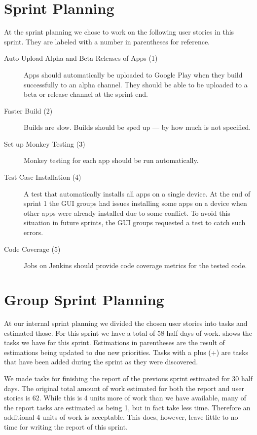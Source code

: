 \section{\bdtitle Sprint Planning}\label{sec:S2_bd}
At the \bd sprint planning we chose to work on the following user stories in this sprint. They are labeled with a number in parentheses for reference.

\begin{description}
  \item[Auto Upload Alpha and Beta Releases of Apps (1)] Apps should automatically be uploaded to Google Play when they build successfully to an alpha channel. They should be able to be uploaded to a beta or release channel at the sprint end.
  \item[Faster Build (2)] Builds are slow. Builds should be sped up --- by how much is not specified.
  \item[Set up Monkey Testing (3)] Monkey testing for each app should be run automatically.
  \item[Test Case Installation (4)] A test that automatically installs all apps on a single device. At the end of sprint 1 the GUI groups had issues installing some apps on a device when other apps were already installed due to some conflict. To avoid this situation in future sprints, the GUI groups requested a test to catch such errors.
  \item[Code Coverage (5)] Jobs on Jenkins should provide code coverage metrics for the tested code.
\end{description}

\section{Group Sprint Planning}\label{sec:S2_group}
At our internal sprint planning we divided the chosen user stories into tasks and estimated those. For this sprint we have a total of 58 half days of work.  shows the tasks we have for this sprint. Estimations in parentheses are the result of estimations being updated to due new priorities. Tasks with a plus (+) are tasks that have been added during the sprint as they were discovered.

We made tasks for finishing the report of the previous sprint estimated for 30 half days. The original total amount of work estimated for both the report and user stories is 62. While this is 4 units more of work than we have available, many of the report tasks are estimated as being 1, but in fact take less time. Therefore an additional 4 units of work is acceptable. This does, however, leave little to no time for writing the report of this sprint.

